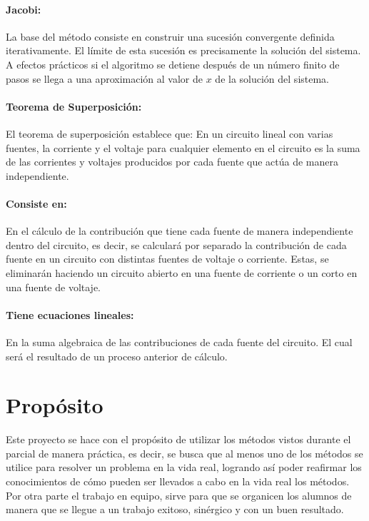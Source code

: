 \documentclass[12pt]{article}
\begin{document}
\paragraph{Jacobi:} 
La base del método consiste en construir una sucesión convergente definida iterativamente. El límite de esta sucesión es precisamente la solución del sistema. A efectos prácticos si el algoritmo se detiene después de un número finito de pasos se llega a una aproximación al valor de $x$ de la solución del sistema.

\paragraph{Teorema de Superposición:} 
El teorema de superposición establece que:
En un circuito lineal con varias fuentes, la corriente y el voltaje para cualquier elemento en el circuito es la suma de las corrientes y voltajes producidos por cada fuente que actúa de manera independiente.

\paragraph{Consiste en:} 
En el cálculo de la contribución que tiene cada fuente de manera independiente dentro del circuito, es decir, se calculará por separado la contribución de cada fuente en un circuito con distintas fuentes de voltaje o corriente. Estas, se eliminarán haciendo un circuito abierto en una fuente de corriente o un corto en una fuente de voltaje.

\paragraph{Tiene ecuaciones lineales:}
En la suma algebraica de las contribuciones de cada fuente del circuito. El cual será el resultado de un proceso anterior de cálculo.

\section{Propósito}\label{previous work}
Este proyecto se hace con el propósito de utilizar los métodos vistos durante el parcial de manera práctica, es decir, se busca que al menos uno de los métodos se utilice para resolver un problema en la vida real, logrando así poder reafirmar los conocimientos de cómo pueden ser llevados a cabo en la vida real los métodos.
Por otra parte el trabajo en equipo, sirve para que se organicen los alumnos de manera que se llegue a un trabajo exitoso, sinérgico y con un buen resultado.
 
\end{document}
